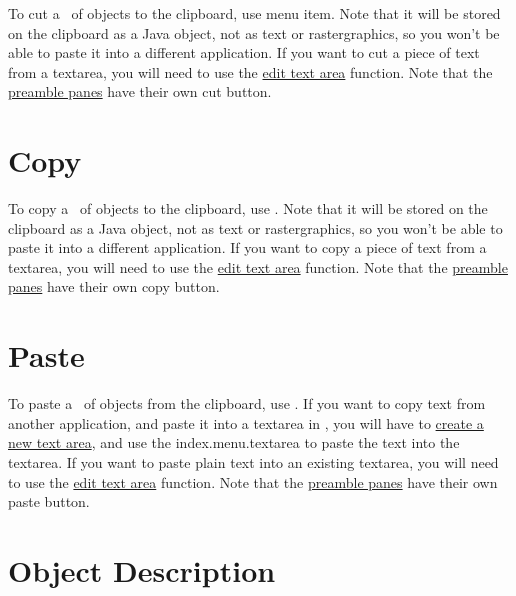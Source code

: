 
To cut a \selection\ of \glspl{object} to the
clipboard, use  menu item. Note that it will be stored
on the clipboard as a  Java object, not as text or
\gls{rastergraphics}, so you won't be able to paste it into a different
application.  If you want to cut a piece of text
from a \gls{textarea}, you will need to use the
\hyperref[sec:edittext]{edit text area} function.
Note that the \hyperref[sec:preamble]{preamble panes} have
their own cut button.

\section{Copy}\label{sec:copyobjects}


To copy a \selection\ of \glspl{object} to the
clipboard, use . Note that it will be stored
on the clipboard as a  Java object, not as text or
\gls{rastergraphics}, so you won't be able to paste it into a different
application.  If you want to copy a piece of text from a
\gls{textarea}, you will need to use the
\hyperref[sec:edittext]{edit text area} function.
Note that the \hyperref[sec:preamble]{preamble panes} have
their own copy button.

\section{Paste}\label{sec:pasteobjects}


To paste a \selection\ of \glspl{object} from the clipboard, use
. If you want to copy text from another
application, and paste it into a \gls{textarea} in \FlowframTk, you
will have to \hyperref[sec:newtext]{create a new text area}, and
use the \gls{index.menu.textarea} to paste the text into the
\gls*{textarea}.  If you want to paste plain text into an existing
\gls*{textarea}, you will need to use the
\hyperref[sec:edittext]{edit text area} function.  Note that the
\hyperref[sec:preamble]{preamble panes} have their own paste button.

\section{Object Description}\label{sec:objectdescription}


